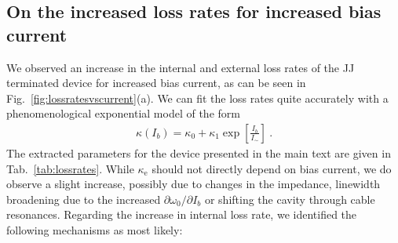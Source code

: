 \subsection{On the increased loss rates for increased bias current}\label{sec:lossrates}

% 
We observed an increase in the internal and external loss rates of the JJ terminated device for increased bias current, as can be seen in Fig.~\ref{fig:lossratesvscurrent}(a).
% 
We can fit the loss rates quite accurately with a phenomenological exponential model of the form
% 
\begin{align}
\kappa(I_b) = \kappa_0 + \kappa_1 \exp\left[\frac{I_b}{I_{\sim}}\right]\ .
\label{eq:lossrates}
\end{align}
% 
The extracted parameters for the device presented in the main text are given in Tab.~\ref{tab:lossrates}.
% 
While $\kappa_\text{e}$ should not directly depend on bias current, we do observe a slight increase, possibly due to changes in the impedance, linewidth broadening due to the increased $\partial\omega_0/\partial I_b$ or shifting the cavity through cable resonances.
% 
Regarding the increase in internal loss rate, we identified the following mechanisms as most likely:
% 
